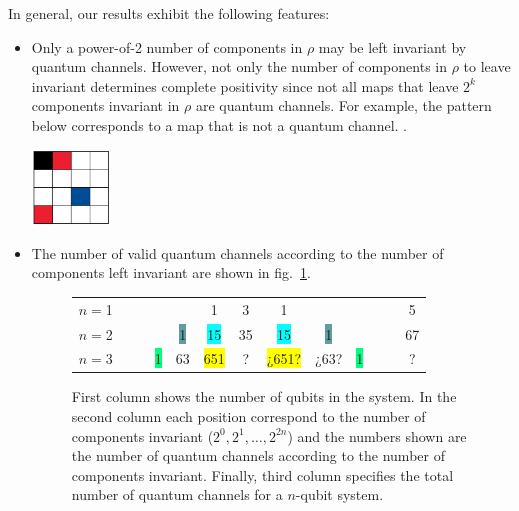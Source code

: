 \documentclass[11pt,dvipsnames]{article} %
\newcommand{\fref}[1]{fig.~\ref{#1}}  \newcommand{\tref}[1]{table~\ref{#1}}
\newcommand{\1}{\mathds{1}}
\begin{document}
In general, our results exhibit the following features:
\begin{itemize}
\item Only a power-of-2 number of components in $\rho$ 
may be left invariant by quantum
channels. However, not only the number of components in $\rho$ 
to leave invariant determines complete positivity since
not all maps that leave $2^{k}$ components invariant in $\rho$
are quantum channels. For example, the pattern below corresponds 
to a map that is not a quantum channel. . %
\begin{center}
	\includegraphics[height=2cm]{img/not-cc}
\end{center}

\item 
The number of valid quantum channels according to the number of components
left invariant are shown in \fref{fig:CCs-by-components}.


\begin{figure}[H]%
	\centering
	\begin{tabular}{>{$n=$}l<{\hfill}*{12}{c}}
1 &&&&&\colorbox{Apricot}{1}&3&\colorbox{Apricot}{1}&&&&&5\\
2 &&&&\colorbox{CadetBlue}{1}&\colorbox{Cyan}{15}&35&\colorbox{Cyan}{15}&\colorbox{CadetBlue}{1}&&&&67\\
3 &&&\colorbox{SpringGreen}{1}&\colorbox{RedOrange}{63}&\colorbox{Yellow}{651}&?&\colorbox{Yellow}{¿651?}&
\colorbox{RedOrange}{¿63?}&\colorbox{SpringGreen}{1}&&&?
\end{tabular}
\caption{First column shows the number of qubits in the system.  In the second
column each position correspond to the number of components invariant ($2^0,
2^1, \ldots, 2^{2n}$) and the numbers shown are the number of quantum channels
according to the number of components invariant.  Finally, third column
specifies the total number of quantum channels for a $n$-qubit system.}
\label{fig:CCs-by-components}
\end{figure} %


\end{itemize}
\end{document}
